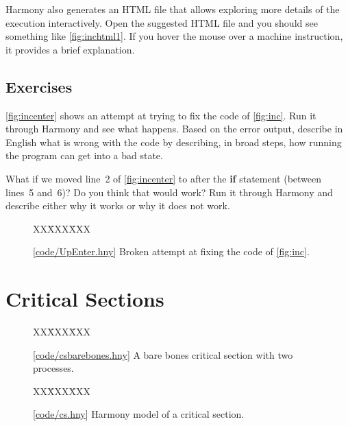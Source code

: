 \documentclass{report}
\newcommand{\harmonysource}[1]{
\begin{tabbing}
XX\=XXX\=XXX\kill
    
\end{tabbing}
}
\newcommand{\harmonylink}[1]{%
[\href{https://www.cs.cornell.edu/home/rvr/harmony/#1}{\underline{#1}}]%
}
\newenvironment{code}{
\tcolorbox
}{
\endtcolorbox
}
\begin{document}
Harmony also generates an HTML file that allows exploring more details
of the execution interactively.
Open the suggested HTML file and you should see something like
\autoref{fig:inchtml1}.
If you hover the mouse over a machine instruction, it provides a
brief explanation.

\section*{Exercises}

\begin{problems}
\item \autoref{fig:incenter} shows an attempt at trying to fix the code of
    \autoref{fig:inc}.  Run it through Harmony and see what happens.  Based on
    the error output, describe in English what is wrong with the code by describing,
    in broad steps, how running the program can get into a bad state.
\item What if we moved line~2 of \autoref{fig:incenter} to after the \textbf{if}
    statement (between lines~5 and~6)?  Do you think that would work?  Run it through
    Harmony and describe either why it works or why it does not work.
\end{problems}

\begin{figure}
\begin{code}
\harmonysource{UpEnter}
\end{code}
\caption{\harmonylink{code/UpEnter.hny} Broken attempt at fixing the code of \autoref{fig:inc}.}
\label{fig:incenter}
\end{figure}

\chapter{Critical Sections}
\label{ch:critical}

\begin{figure}
\begin{code}
\harmonysource{csbarebones}
\end{code}
\caption{\harmonylink{code/csbarebones.hny} A bare bones critical section with two processes.}
\label{fig:csbarebones}
\end{figure}

\begin{figure}
\begin{code}
\harmonysource{cs}
\end{code}
\caption{\harmonylink{code/cs.hny} Harmony model of a critical section.}
\label{fig:cs}
\end{figure}
\end{document}
